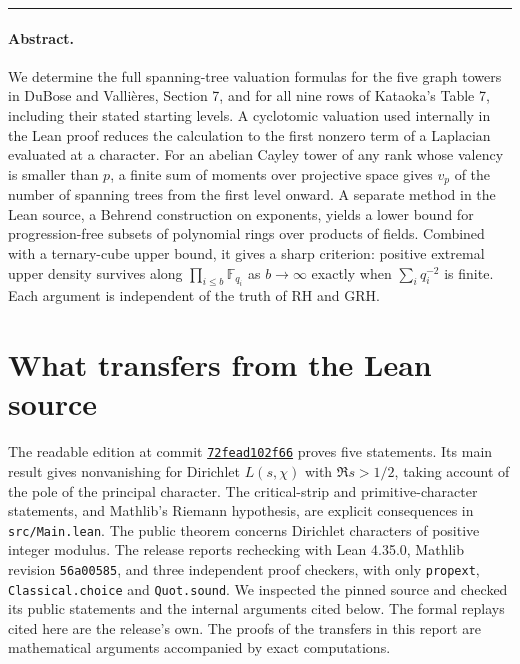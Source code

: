 \documentclass[10pt,letterpaper]{article}
\theoremstyle{remark}\newtheorem{remark}[theorem]{Remark}
\begin{document}
\thispagestyle{plain}
\par
\vspace{.55cm}
\par
{}\par
\vspace{.18cm}
\par
\vspace{.30cm}
\noindent\rule{\linewidth}{.5pt}\par
\paragraph{Abstract.}
We determine the full spanning-tree valuation formulas for the five graph
towers in DuBose and Vallières, Section 7, and for all nine rows of
Kataoka's Table 7, including their stated starting levels. A cyclotomic
valuation used internally in the Lean proof reduces the calculation to the
first nonzero term of a Laplacian evaluated at a character. For an abelian
Cayley tower of any rank whose valency is smaller than $p$, a finite sum
of moments over projective space gives $v_p$ of the number of spanning
trees from the first level onward. A separate method in the Lean source,
a Behrend construction on exponents, yields a lower bound for
progression-free subsets of polynomial rings over products of fields.
Combined with a ternary-cube upper bound, it gives a sharp criterion:
positive extremal upper density survives along $\prod_{i\le b}\mathbb F_{q_i}$
as $b\to\infty$ exactly when $\sum_iq_i^{-2}$ is finite.
Each argument is independent of the truth of RH and GRH.
\tableofcontents

\section{What transfers from the Lean source}\label{sec:source}
The readable edition at commit
\href{https://github.com/lsernau/grh-lean/tree/72fead102f663d5c7a407964a13dc0cf9d977207}{\texttt{72fead102f66}}
proves five statements. Its main result gives nonvanishing for Dirichlet
$L(s,\chi)$ with $\Re s>1/2$, taking account of the pole of the principal
character. The critical-strip and primitive-character statements, and
Mathlib's Riemann hypothesis, are explicit consequences in
\texttt{src/Main.lean}. The public theorem concerns Dirichlet characters
of positive integer modulus. The release reports rechecking with Lean
4.35.0, Mathlib revision \texttt{56a00585}, and three independent proof checkers,
with only \texttt{propext}, \texttt{Classical.choice} and \texttt{Quot.sound}.
We inspected the pinned source and checked its public statements and the internal arguments cited below. The formal replays cited here are the
release's own. The proofs of the transfers in this report are mathematical
arguments accompanied by exact computations.
\end{document}
